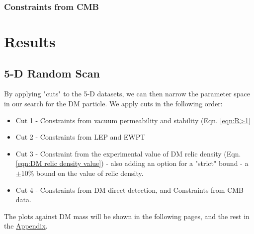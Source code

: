 \documentclass[12pt]{article}
\begin{document}
\subsubsection{Constraints from CMB}

\section{Results}
\label{sec:results}
\subsection{5-D Random Scan}
\label{5-D scan}
By applying "cuts" to the 5-D datasets, we can then narrow the parameter space in our search for the DM particle.
We apply cuts in the following order:
\begin{itemize}
    \item Cut 1 - Constraints from vacuum permeability and stability (Eqn. \ref{eqn:R>1}
    \item Cut 2 - Constraints from LEP and EWPT
    \item Cut 3 - Constraint from the experimental value of DM relic density (Eqn. \ref{eqn:DM relic density value}) - also adding an option for a "strict" bound - a $\pm 10 \%$ bound on the value of relic density.
    \item Cut 4 - Constraints from DM direct detection, and Constraints from CMB data.
\end{itemize}

The plots against DM mass will be shown in the following pages, and the rest in the \hyperref[Appendix]{Appendix}.
\end{document}
